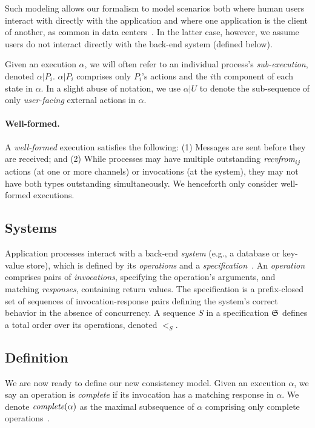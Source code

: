 Such modeling allows our formalism to model scenarios both where human users interact with
directly with the application and where one application is the client
of another, as common in data centers~\cite{veeraraghavan2016kraken,schwarzkopf2018operating}.
In the latter case, however, we assume users do not interact directly with the back-end system (defined below).

Given an execution $\alpha$, we will often refer to an individual process's
\textit{sub-execution}, denoted $\alpha|P_i$. $\alpha|P_i$ comprises
only $P_i$'s actions and the $i$th component of each state in $\alpha$.
In a slight abuse of notation, we use $\alpha|U$ to denote the sub-sequence
of only \textit{user-facing} external actions in $\alpha$. 

\paragraph{Well-formed.} A \textit{well-formed} execution
satisfies the following: (1) Messages are sent before they are received; and
(2) While processes may have multiple outstanding $\operatorname*{\textit{recvfrom}}_{ij}$ actions
(at one or more channels) or invocations (at the system), they may not have
both types outstanding simultaneously.
We henceforth only consider well-formed
executions.

\subsection{Systems}
\label{sec:mdl:systems}

Application processes interact with a back-end \textit{system} (e.g., a database or key-value store),
which is defined by its \textit{operations} and a
\textit{specification}~\cite{herlihy1990linearizability,lynch1996da}. An
\textit{operation} comprises pairs of \textit{invocations}, specifying the
operation's arguments, and matching \textit{responses}, containing
return values. The specification is a prefix-closed set of sequences of
invocation-response pairs defining the system's correct behavior in the absence
of concurrency. A sequence $S$ in a specification $\mathfrak{S}$ defines a total order
over its operations, denoted $<_S$.

\subsection{Definition}
\label{sec:mdl:def}

We are now ready to define our new consistency model.
Given an execution $\alpha$, we say an
operation is \textit{complete} if its invocation has a matching response in
$\alpha$. We denote $\operatorname*{\textit{complete}}(\alpha)$ as the maximal subsequence of $\alpha$
comprising only complete operations~\cite{herlihy1990linearizability}.

